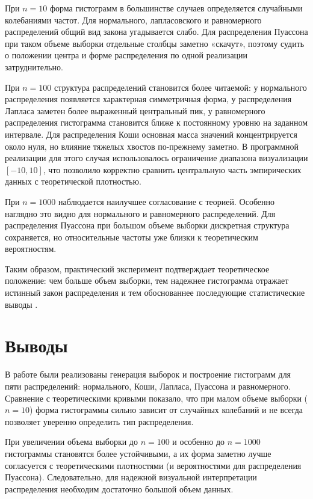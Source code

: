 \documentclass[a4paper, 14pt]{extarticle}
\begin{document}
При $n=10$ форма гистограмм в большинстве случаев определяется случайными колебаниями частот. Для нормального, лапласовского и равномерного распределений общий вид закона угадывается слабо. Для распределения Пуассона при таком объеме выборки отдельные столбцы заметно «скачут», поэтому судить о положении центра и форме распределения по одной реализации затруднительно.

При $n=100$ структура распределений становится более читаемой: у нормального распределения появляется характерная симметричная форма, у распределения Лапласа заметен более выраженный центральный пик, у равномерного распределения гистограмма становится ближе к постоянному уровню на заданном интервале. Для распределения Коши основная масса значений концентрируется около нуля, но влияние тяжелых хвостов по-прежнему заметно. В программной реализации для этого случая использовалось ограничение диапазона визуализации $[-10,10]$, что позволило корректно сравнить центральную часть эмпирических данных с теоретической плотностью.

При $n=1000$ наблюдается наилучшее согласование с теорией. Особенно наглядно это видно для нормального и равномерного распределений. Для распределения Пуассона при большом объеме выборки дискретная структура сохраняется, но относительные частоты уже близки к теоретическим вероятностям.

Таким образом, практический эксперимент подтверждает теоретическое положение: чем больше объем выборки, тем надежнее гистограмма отражает истинный закон распределения и тем обоснованнее последующие статистические выводы \cite{babakhina, maksimov}.

\section{Выводы}

В работе были реализованы генерация выборок и построение гистограмм для пяти распределений: нормального, Коши, Лапласа, Пуассона и равномерного. Сравнение с теоретическими кривыми показало, что при малом объеме выборки ($n=10$) форма гистограммы сильно зависит от случайных колебаний и не всегда позволяет уверенно определить тип распределения.

При увеличении объема выборки до $n=100$ и особенно до $n=1000$ гистограммы становятся более устойчивыми, а их форма заметно лучше согласуется с теоретическими плотностями (и вероятностями для распределения Пуассона). Следовательно, для надежной визуальной интерпретации распределения необходим достаточно большой объем данных.
 
\end{document}
